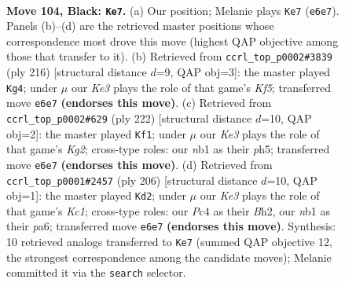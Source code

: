 \documentclass[11pt]{article}
\begin{document}
\clearpage

\begin{figure}[p]\centering
\begin{subfigure}{0.46\textwidth}\centering
\resizebox{\linewidth}{!}{%
\newchessgame
\chessboard[
  setfen={8/8/1B2k3/8/p1p3b1/8/5K2/1N6 b - - 63 104},
  showmover=false,
  pgfstyle=straightmove, color=movearrow, markmove={e6-e7}
]}
\caption{}
\end{subfigure}\hfill
\begin{subfigure}{0.46\textwidth}\centering
\resizebox{\linewidth}{!}{%
\newchessgame
\chessboard[
  setfen={8/4k3/8/2bP1KP1/8/3B4/8/8 w - - 77 109},
  showmover=false,
  pgfstyle=straightmove, color=movearrow, markmove={f5-g4}
]}
\caption{}
\end{subfigure}
\\[4pt]
\begin{subfigure}{0.46\textwidth}\centering
\resizebox{\linewidth}{!}{%
\newchessgame
\chessboard[
  setfen={8/1PbB4/8/7p/5k1P/8/6K1/8 w - - 11 112},
  showmover=false,
  pgfstyle=straightmove, color=movearrow, markmove={g2-f1}
]}
\caption{}
\end{subfigure}\hfill
\begin{subfigure}{0.46\textwidth}\centering
\resizebox{\linewidth}{!}{%
\newchessgame
\chessboard[
  setfen={4k3/8/p7/P7/b7/8/7B/2K5 w - - 14 104},
  showmover=false,
  pgfstyle=straightmove, color=movearrow, markmove={c1-d2}
]}
\caption{}
\end{subfigure}
\caption{\textbf{Move 104, Black: \texttt{Ke7}.} (a) Our position; Melanie plays \texttt{Ke7} (\texttt{e6e7}). Panels (b)--(d) are the retrieved master positions whose correspondence most drove this move (highest QAP objective among those that transfer to it). (b) Retrieved from \texttt{ccrl\_top\_p0002\#3839} (ply 216) [structural distance $d$=9, QAP obj=3]: the master played \texttt{Kg4}; under $\mu$ our \emph{Ke3} plays the role of that game's \emph{Kf5}; transferred move \texttt{e6e7} \textbf{(endorses this move)}. (c) Retrieved from \texttt{ccrl\_top\_p0002\#629} (ply 222) [structural distance $d$=10, QAP obj=2]: the master played \texttt{Kf1}; under $\mu$ our \emph{Ke3} plays the role of that game's \emph{Kg2}; cross-type roles: our \emph{n}b1 as their \emph{p}h5; transferred move \texttt{e6e7} \textbf{(endorses this move)}. (d) Retrieved from \texttt{ccrl\_top\_p0001\#2457} (ply 206) [structural distance $d$=10, QAP obj=1]: the master played \texttt{Kd2}; under $\mu$ our \emph{Ke3} plays the role of that game's \emph{Kc1}; cross-type roles: our \emph{P}c4 as their \emph{B}h2, our \emph{n}b1 as their \emph{p}a6; transferred move \texttt{e6e7} \textbf{(endorses this move)}. Synthesis: 10 retrieved analogs transferred to \texttt{Ke7} (summed QAP objective 12, the strongest correspondence among the candidate moves); Melanie committed it via the \texttt{search} selector.}
\label{fig:thought-m207}
\end{figure}
\end{document}
